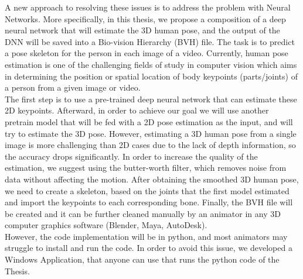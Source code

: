 A new approach to resolving these issues is to address the problem with Neural Networks. More specifically, in this thesis, we propose a composition of a deep neural network \cite{Exploiting temporal information for 3D pose estimation} that will estimate the 3D human pose, and the output of the DNN will be saved into a Bio-vision Hierarchy (BVH) file. The task is to predict a pose skeleton for the person in each image of a video. Currently, human pose estimation is one of the challenging fields of study in computer vision which aims in determining the position or spatial location of body keypoints (parts/joints) of a person from a given image or video. \\

The first step is to use a pre-trained deep neural network that can estimate these 2D keypoints. Afterward, \cite{3D Human Pose Estimation from Deep Multi-View 2D Pose,3D Human Pose Estimation Using Convolutional Neural Networks with 2D Pose Information} in order to achieve our goal we will use another pretrain model that will be fed with a 2D pose estimation as the input, and will try to estimate the 3D pose. However, estimating a 3D human pose from a single image is more challenging than 2D cases due to the lack of depth information, so the accuracy drops significantly. In order to increase the quality of the estimation, we suggest using the butter-worth filter, which removes noise from data without affecting the motion. After obtaining the smoothed 3D human pose, we need to create a skeleton, based on the joints that the first model estimated and import the keypoints to each corresponding bone. Finally, the BVH file will be created and it can be further cleaned manually by an animator in any 3D computer graphics software (Blender, Maya, AutoDesk). \\

However, the code implementation will be in python, and most animators may struggle to install and run the code. In order to avoid this issue, we developed a Windows Application, that anyone can use that runs the python code of the Thesis. 